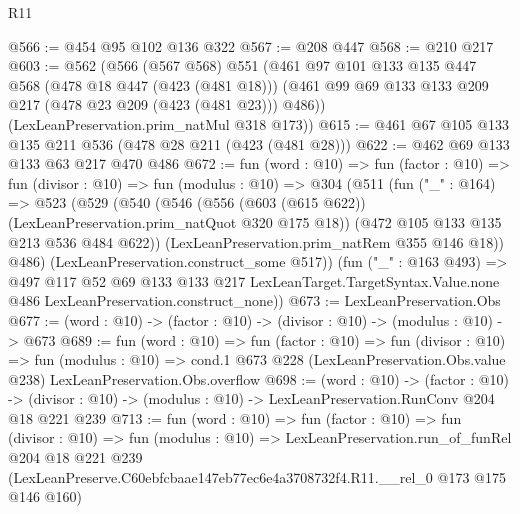 \begin{lexlean}{R11}
\begin{coremodule}
@566 := @454 @95 @102 @136 @322
@567 := @208 @447
@568 := @210 @217
@603 := @562
    (@566
      (@567 @568)
      @551
      (@461
        @97
        @101
        @133
        @135
        @447
        @568
        (@478 @18 @447 (@423 (@481 @18)))
        (@461 @99 @69 @133 @133 @209 @217 (@478 @23 @209 (@423 (@481 @23))) @486))
      (LexLeanPreservation.prim_natMul @318 @173))
@615 := @461 @67 @105 @133 @135 @211 @536 (@478 @28 @211 (@423 (@481 @28)))
@622 := @462 @69 @133 @133 @63 @217 @470 @486
@672 := fun (word : @10) =>
  fun (factor : @10) =>
  fun (divisor : @10) =>
  fun (modulus : @10) =>
  @304
    (@511
      (fun ("_" : @164) =>
      @523
        (@529
          (@540
            (@546
              (@556 (@603 (@615 @622)) (LexLeanPreservation.prim_natQuot @320 @175 @18))
              (@472 @105 @133 @135 @213 @536 @484 @622))
            (LexLeanPreservation.prim_natRem @355 @146 @18))
          @486)
        (LexLeanPreservation.construct_some @517))
      (fun ("_" : @163 @493) =>
      @497
        @117
        @52
        @69
        @133
        @133
        @217
        LexLeanTarget.TargetSyntax.Value.none
        @486
        LexLeanPreservation.construct_none))
@673 := LexLeanPreservation.Obs
@677 := (word : @10) -> (factor : @10) -> (divisor : @10) -> (modulus : @10) -> @673
@689 := fun (word : @10) =>
  fun (factor : @10) =>
  fun (divisor : @10) =>
  fun (modulus : @10) =>
  cond.{1} @673 @228 (LexLeanPreservation.Obs.value @238) LexLeanPreservation.Obs.overflow
@698 := (word : @10) ->
  (factor : @10) ->
  (divisor : @10) -> (modulus : @10) -> LexLeanPreservation.RunConv @204 @18 @221 @239
@713 := fun (word : @10) =>
  fun (factor : @10) =>
  fun (divisor : @10) =>
  fun (modulus : @10) =>
  LexLeanPreservation.run_of_funRel
    @204
    @18
    @221
    @239
    (LexLeanPreserve.C60ebfcbaae147eb77ec6e4a3708732f4.R11.__rel_0 @173 @175 @146 @160)
\end{coremodule}
\end{lexlean}

